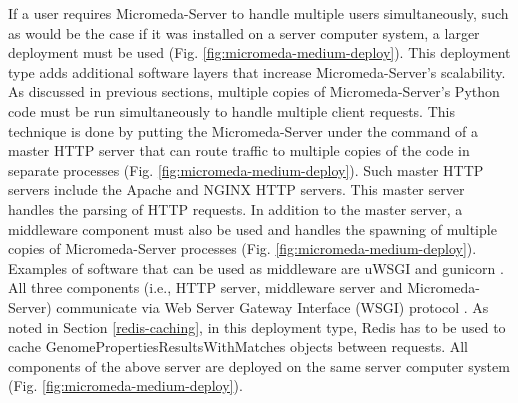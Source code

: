 If a user requires Micromeda-Server to handle multiple users simultaneously, such as would be the case if it was installed on a server computer system, a larger deployment must be used (Fig. \ref{fig:micromeda-medium-deploy}). This deployment type adds additional software layers that increase Micromeda-Server's scalability. As discussed in previous sections, multiple copies of Micromeda-Server's Python code must be run simultaneously to handle multiple client requests. This technique is done by putting the Micromeda-Server under the command of a master HTTP server that can route traffic to multiple copies of the code in separate processes (Fig. \ref{fig:micromeda-medium-deploy}). Such master HTTP servers include the Apache \cite{fielding1997apache} and NGINX \cite{reese2008nginx} HTTP servers. This master server handles the parsing of HTTP requests. In addition to the master server, a middleware component must also be used and handles the spawning of multiple copies of Micromeda-Server processes (Fig. \ref{fig:micromeda-medium-deploy}). Examples of software that can be used as middleware are uWSGI \cite{2019uwsgi} and gunicorn \cite{chesneau_2018}. All three components (i.e., HTTP server, middleware server and Micromeda-Server) communicate via Web Server Gateway Interface (WSGI) protocol \cite{gardner2009web}. As noted in Section \ref{redis-caching}, in this deployment type, Redis has to be used to cache GenomePropertiesResultsWithMatches objects between requests. All components of the above server are deployed on the same server computer system (Fig. \ref{fig:micromeda-medium-deploy}).

